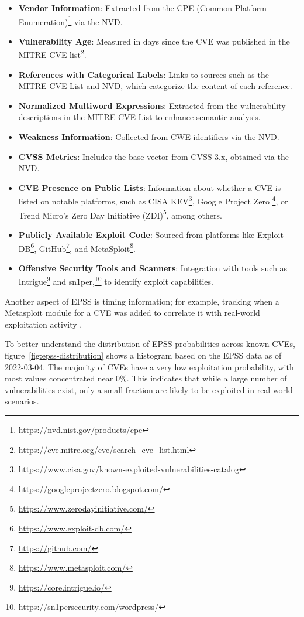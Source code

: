\begin{itemize}
    \item \textbf{Vendor Information}: Extracted from the CPE (Common Platform Enumeration)\footnote{\url{https://nvd.nist.gov/products/cpe}} via the \ac{NVD}.
    \item \textbf{Vulnerability Age}: Measured in days since the \ac{CVE} was published in the MITRE \ac{CVE} list\footnote{\url{https://cve.mitre.org/cve/search_cve_list.html}}.
    \item \textbf{References with Categorical Labels}: Links to sources such as the MITRE \ac{CVE} List and \ac{NVD}, which categorize the content of each reference.
    \item \textbf{Normalized Multiword Expressions}: Extracted from the vulnerability descriptions in the MITRE \ac{CVE} List to enhance semantic analysis.
    \item \textbf{Weakness Information}: Collected from \ac{CWE} identifiers via the \ac{NVD}.
    \item \textbf{\ac{CVSS} Metrics}: Includes the base vector from CVSS 3.x, obtained via the \ac{NVD}.
    \item \textbf{\ac{CVE} Presence on Public Lists}: Information about whether a \ac{CVE} is listed on notable platforms, such as CISA KEV\footnote{\url{https://www.cisa.gov/known-exploited-vulnerabilities-catalog}}, Google Project Zero \footnote{\url{https://googleprojectzero.blogspot.com/}}, or Trend Micro's Zero Day Initiative (ZDI)\footnote{\url{https://www.zerodayinitiative.com/}}, among others.
    \item \textbf{Publicly Available Exploit Code}: Sourced from platforms like Exploit-DB\footnote{\url{https://www.exploit-db.com/}}, GitHub\footnote{\url{https://github.com/}}, and MetaSploit\footnote{\url{https://www.metasploit.com/}}.
    \item \textbf{Offensive Security Tools and Scanners}: Integration with tools such as Intrigue\footnote{\url{https://core.intrigue.io/}} and sn1per,\footnote{\url{https://sn1persecurity.com/wordpress/}} to identify exploit capabilities.
\end{itemize}

Another aspect of \ac{EPSS} is timing information; for example, tracking when a Metasploit module for a \ac{CVE} was added to correlate it with real-world exploitation activity \autocite{first_epss_2024}.

To better understand the distribution of \ac{EPSS} probabilities across known \ac{CVE}s, figure~\ref{fig:epss-distribution} shows a histogram based on the \ac{EPSS} data as of 2022-03-04. The majority of \ac{CVE}s have a very low exploitation probability, with most values concentrated near 0\%. This indicates that while a large number of vulnerabilities exist, only a small fraction are likely to be exploited in real-world scenarios.


